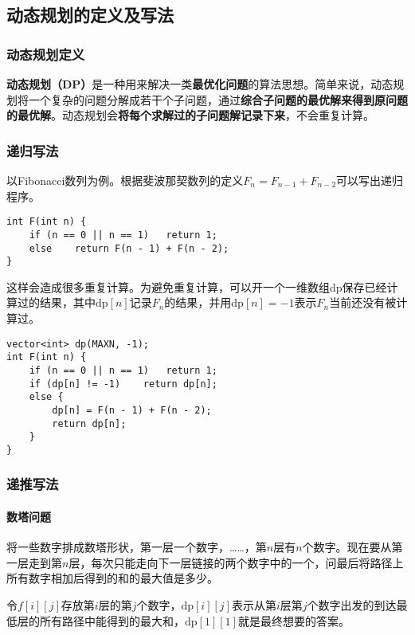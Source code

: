 \subsection{动态规划的定义及写法}

\subsubsection{动态规划定义}

\textbf{动态规划（DP）}是一种用来解决一类\textbf{最优化问题}的算法思想。简单来说，动态规划将一个复杂的问题分解成若干个子问题，通过\textbf{综合子问题的最优解来得到原问题的最优解}。动态规划会\textbf{将每个求解过的子问题解记录下来}，不会重复计算。

\subsubsection{递归写法}

以Fibonacci数列为例。根据斐波那契数列的定义$F_n=F_{n-1}+F_{n-2}$可以写出递归程序。

\begin{lstlisting}
int F(int n) {
	if (n == 0 || n == 1)	return 1;
	else	return F(n - 1) + F(n - 2);
}
\end{lstlisting}

这样会造成很多重复计算。为避免重复计算，可以开一个一维数组dp保存已经计算过的结果，其中$\textrm{dp}[n]$记录$F_n$的结果，并用$\textrm{dp}[n]=-1$表示$F_n$当前还没有被计算过。

\begin{lstlisting}
vector<int> dp(MAXN, -1);
int F(int n) {
	if (n == 0 || n == 1)	return 1;
	if (dp[n] != -1)	return dp[n];
	else {
		dp[n] = F(n - 1) + F(n - 2);
		return dp[n];
	}
}
\end{lstlisting}

\subsubsection{递推写法}

\paragraph{数塔问题}

将一些数字排成数塔形状，第一层一个数字，……，第$n$层有$n$个数字。现在要从第一层走到第$n$层，每次只能走向下一层链接的两个数字中的一个，问最后将路径上所有数字相加后得到的和的最大值是多少。

令$f[i][j]$存放第$i$层的第$j$个数字，$\textrm{dp}[i][j]$表示从第$i$层第$j$个数字出发的到达最低层的所有路径中能得到的最大和，$\textrm{dp}[1][1]$就是最终想要的答案。

